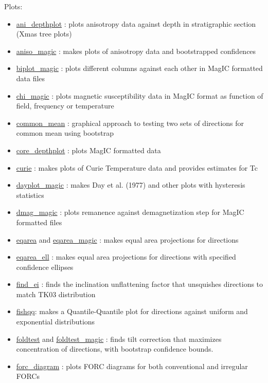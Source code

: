 \documentclass[11pt]{book}
\begin{document}
{{Plots:

\begin{itemize}

  \item \href{http://pmagpy.github.io/PmagPy.html#ani_depthplot}{ani\_depthplot} : plots anisotropy data against depth in stratigraphic section (Xmas tree plots)
\item \href{http://pmagpy.github.io/PmagPy.html#aniso_magic}{aniso\_magic} : makes plots of anisotropy data and bootstrapped confidences
\item \href{http://pmagpy.github.io/PmagPy.html#biplot_magic}{biplot\_magic} : plots different columns against each other in MagIC formatted data files
\item \href{http://pmagpy.github.io/PmagPy.html#chi_magic}{chi\_magic} : plots magnetic susceptibility data in MagIC format as function of field, frequency or temperature
\item \href{http://pmagpy.github.io/PmagPy.html#common_mean}{common\_mean} : graphical approach to testing two sets of directions for common mean using bootstrap
\item \href{http://pmagpy.github.io/PmagPy.html#core_depthplot}{core\_depthplot} : plots MagIC formatted data
\item \href{http://pmagpy.github.io/PmagPy.html#curie}{curie} : makes plots of Curie Temperature data and provides estimates for Tc
\item \href{http://pmagpy.github.io/PmagPy.html#dayplot}{dayplot\_magic} : makes Day et al. (1977) and other plots with hysteresis statistics
\item \href{http://pmagpy.github.io/PmagPy.html#dmag_magic}{dmag\_magic} : plots remanence against demagnetization step for MagIC formatted files
\item \href{http://pmagpy.github.io/PmagPy.html#eqarea}{eqarea} and \href{http://pmagpy.github.io/PmagPy.html#eqarea_magic}{eqarea\_magic} : makes equal area projections for directions
\item \href{http://pmagpy.github.io/PmagPy.html#eqarea_ell}{eqarea\_ell} : makes equal area projections for directions with specified confidence ellipses
\item \href{http://pmagpy.github.io/PmagPy.html#find_ei}{find\_ei} : finds the inclination unflattening factor that unsquishes directions to match TK03 distribution
\item \href{http://pmagpy.github.io/PmagPy.html#fishqq}{fishqq}: makes a Quantile-Quantile plot for directions against uniform and exponential distributions
\item \href{http://pmagpy.github.io/PmagPy.html#foldtest}{foldtest} and \href{http://pmagpy.github.io/PmagPy.html#foldtest_magic}{foldtest\_magic} : finds  tilt correction that maximizes concentration of directions, with bootstrap confidence bounds.
  \item \href{http://pmagpy.github.io/PmagPy.html#forc_diagram}{forc\_diagram} : plots FORC diagrams for both conventional and irregular FORCs


\end{itemize}}}
\end{document}
